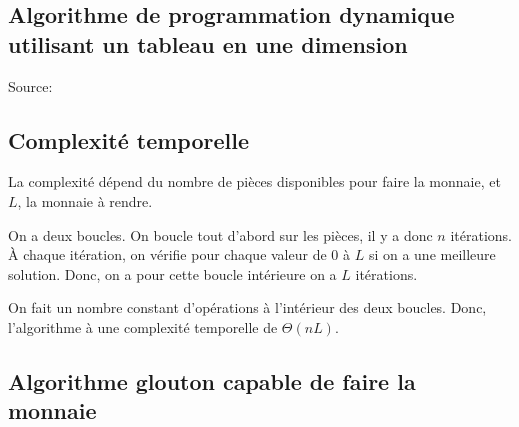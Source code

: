\documentclass[10.9pt]{article} %
\begin{document}
\subsection{Algorithme de programmation dynamique utilisant un tableau en une dimension}

Source: \url{}

\begin{algorithm}
\end{algorithm}

\subsection{Complexité temporelle}

La complexité dépend du nombre de pièces disponibles pour faire la monnaie, et $L$, la monnaie
à rendre.

On a deux boucles. On boucle tout d'abord sur les pièces, il y a donc $n$ itérations.
À chaque itération, on vérifie pour chaque valeur de $0$ à $L$ si on a une meilleure solution.
Donc, on a pour cette boucle intérieure on a $L$ itérations. 

On fait un nombre constant d'opérations à l'intérieur des deux boucles. Donc, 
l'algorithme à une complexité temporelle de $\Theta(nL)$.
\newpage
\subsection{Algorithme glouton capable de faire la monnaie}
\end{document}
